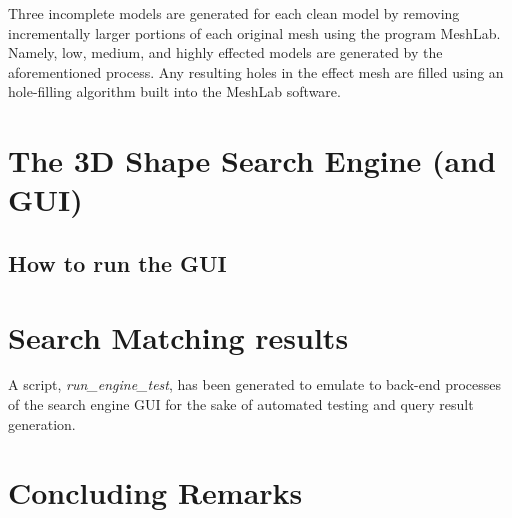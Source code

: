 \documentclass[12pt]{article}
\begin{document}
		\noindent
		Three incomplete models are generated for each clean model by removing incrementally larger portions of each original mesh using the program MeshLab. Namely, low, medium, and highly effected models are generated by the aforementioned process. Any resulting holes in the effect mesh are filled using an hole-filling algorithm built into the MeshLab software.
 


\section*{The 3D Shape Search Engine (and GUI)}




	\subsection*{How to run the GUI}



\section*{Search Matching results}

	\noindent
	A script, \emph{run\_engine\_test}, has been generated to emulate to back-end processes of the search engine GUI for the sake of automated testing and query result generation.




\section*{Concluding Remarks}



	{}
	
\end{document}
